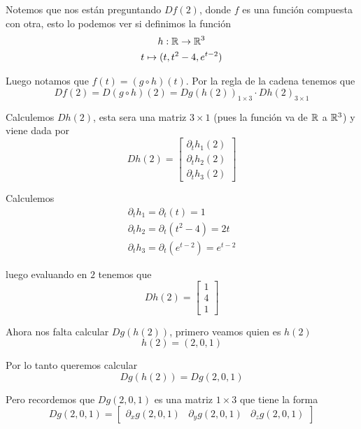 \documentclass[a4paper,oneside,10.5pt]{article}
\begin{document}
\begin{sol}
Notemos que nos están preguntando $Df(2)$, donde $f$ es una función compuesta con otra, esto lo podemos ver si definimos la función
\begin{gather*}
    h : \mathbb{R} \to \mathbb{R}^3\\
    t \mapsto (t, t^2 - 4, e^{t - 2})
\end{gather*}

Luego notamos que $f(t) = (g \circ h)(t)$. Por la regla de la cadena tenemos que
\begin{equation*}
    Df(2) = D(g \circ h)(2) = Dg(h(2))_{1 \times 3} \cdot Dh(2)_{3 \times 1}
\end{equation*}

Calculemos $Dh(2)$, esta sera una matriz $3 \times 1$ (pues la función va de $\mathbb{R}$ a $\mathbb{R}^3$) y viene dada por
\begin{equation*}
    Dh(2) = \begin{bmatrix}
        \partial_t h_1(2)\\ \partial_t h_2(2)\\ \partial_t h_3(2)
    \end{bmatrix}
\end{equation*}

Calculemos
\begin{gather*}
    \partial_t h_1 = \partial_t (t) = 1\\
    \partial_t h_2 = \partial_t (t^2 - 4) = 2t\\
    \partial_t h_3 = \partial_t (e^{t - 2}) = e^{t - 2}
\end{gather*}

luego evaluando en $2$ tenemos que
\begin{equation*}
    Dh(2) = \begin{bmatrix}
        1\\ 4\\ 1
    \end{bmatrix}
\end{equation*}

Ahora nos falta calcular $Dg(h(2))$, primero veamos quien es $h(2)$
\begin{equation*}
    h(2) = (2, 0, 1)
\end{equation*}

Por lo tanto queremos calcular
\begin{equation*}
    Dg(h(2)) = Dg(2, 0, 1)
\end{equation*}

Pero recordemos que $Dg(2, 0, 1)$ es una matriz $1 \times 3$ que tiene la forma
\begin{equation*}
    Dg(2, 0, 1) = \begin{bmatrix}
        \partial_x g (2, 0, 1)& \partial_y g(2, 0, 1) & \partial_z g(2, 0, 1)
    \end{bmatrix}
\end{equation*}


\end{sol}
\end{document}
